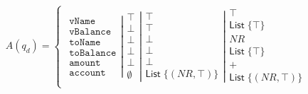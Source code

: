 \begin{align}
    A(q_d)=\left\{\begin{matrix}
                      \left.\begin{matrix}
                                \texttt{vName}\\
                                \texttt{vBalance}\\
                                \texttt{toName}\\
                                \texttt{toBalance}\\
                                \texttt{amount}\\
                                \texttt{account}
                      \end{matrix}\right|
                      \left.\begin{matrix}
                                \top\\
                                \bot\\
                                \bot\\
                                \bot\\
                                \bot\\
                                \emptyset
                      \end{matrix}\right|
                      \left.\begin{matrix}
                                \top\\
                                \top\\
                                \bot\\
                                \bot\\
                                \bot\\
                                \mathsf{List} \; \{(NR, \top)\}
                      \end{matrix}\right|
                      \begin{matrix}
                          \top\\
                          \mathsf{List} \; \{\top\}\\
                          NR\\
                          \mathsf{List} \; \{\top\}\\
                          +\\
                          \mathsf{List} \; \{(NR,\top)\}
                      \end{matrix}
    \end{matrix}\right.
\end{align}

